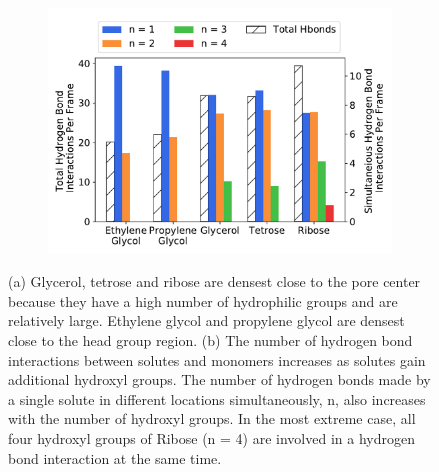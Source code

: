 \documentclass{article}
\begin{document}
\begin{figure}[!htb]
\begin{subfigure}{0.325\textwidth}
  \includegraphics[width=\linewidth]{multi_hbonds.pdf}
  \caption{}\label{fig:multi_hbonds}
  \end{subfigure}
  \caption{(a) Glycerol, tetrose and ribose are densest close to the pore center because
  they have a high number of hydrophilic groups and are relatively large. Ethylene glycol
  and propylene glycol are densest close to the head group region. (b) The number of 
  hydrogen bond interactions between solutes and monomers increases as solutes gain additional
  hydroxyl groups. The number of hydrogen bonds made by a single solute in different locations
  simultaneously, n, also increases with the number of hydroxyl groups. In the most extreme case,
  all four hydroxyl groups of Ribose (n = 4) are involved in a hydrogen bond interaction at
  the same time.}\label{fig:multi_hbonds}
  \end{figure}
  
\end{document}
